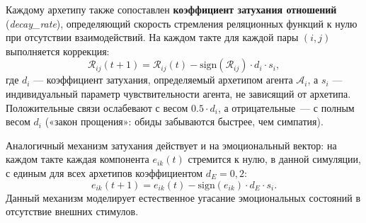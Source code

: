 \documentclass[12pt]{article}
\begin{document}
Каждому архетипу также сопоставлен \textbf{коэффициент затухания отношений} (\textit{decay\_rate}), определяющий скорость стремления реляционных функций к нулю при отсутствии взаимодействий. На каждом такте для каждой пары $(i, j)$ выполняется коррекция:
\[
\mathcal{R}_{ij}(t+1) = \mathcal{R}_{ij}(t) - \text{sign}(\mathcal{R}_{ij}) \cdot d_i \cdot s_i,
\]
где $d_i$ — коэффициент затухания, определяемый архетипом агента $\mathcal{A}_i$, а $s_i$ — индивидуальный параметр чувствительности агента, не зависящий от архетипа. Положительные связи ослабевают с весом $0.5 \cdot d_i$, а отрицательные~--- с полным весом $d_i$ («закон прощения»: обиды забываются быстрее, чем симпатия).

Аналогичный механизм затухания действует и на эмоциональный вектор: на каждом такте каждая компонента $e_{ik}(t)$ стремится к нулю, в данной симуляции, с единым для всех архетипов коэффициентом $d_E = 0{,}2$:
\[
e_{ik}(t+1) = e_{ik}(t) - \text{sign}(e_{ik}) \cdot d_E \cdot s_i.
\]
Данный механизм моделирует естественное угасание эмоциональных состояний в отсутствие внешних стимулов.
\end{document}
